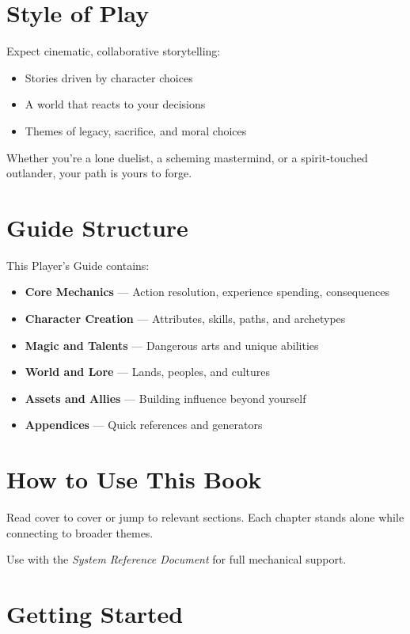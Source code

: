 \section*{Style of Play} 

Expect cinematic, collaborative storytelling: 
\begin{itemize} 
\item Stories driven by character choices 
\item A world that reacts to your decisions 
\item Themes of legacy, sacrifice, and moral choices 
\end{itemize}

Whether you're a lone duelist, a scheming mastermind, or a spirit-touched outlander, your path is yours to forge.

\section*{Guide Structure}

This Player's Guide contains:

\begin{itemize} 
  \item \textbf{Core Mechanics} — Action resolution, experience spending, consequences 
  \item \textbf{Character Creation} — Attributes, skills, paths, and archetypes 
  \item \textbf{Magic and Talents} — Dangerous arts and unique abilities 
  \item \textbf{World and Lore} — Lands, peoples, and cultures 
  \item \textbf{Assets and Allies} — Building influence beyond yourself 
  \item \textbf{Appendices} — Quick references and generators 
\end{itemize}

\section*{How to Use This Book}

Read cover to cover or jump to relevant sections. Each chapter stands alone while connecting to broader themes.

Use with the \emph{System Reference Document} for full mechanical support.

\section*{Getting Started}

